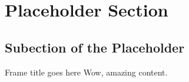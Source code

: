 \section{Placeholder Section}

\subsection{Subection of the Placeholder}

\begin{frame}{Frame title goes here}
    Wow, amazing content.
\end{frame}